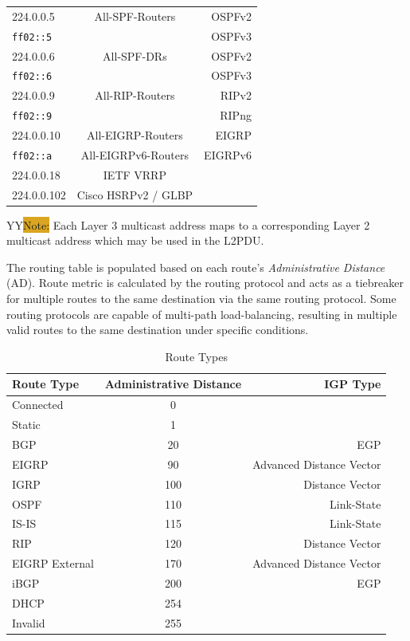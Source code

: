 \documentclass[12pt]{article}
\newcommand{\printColor}{Y}								%
\newcommand{\note}[1]{\if\printColor Y{\colorbox{#1}{Note:}}\else{\underline{Note:}}\fi}
\begin{document}
\begin{table}[H]
\begin{minipage}{.6\linewidth}
\begin{tabular}{| l | c | r|}
	224.0.0.5		& All-SPF-Routers	& OSPFv2\\
	\texttt{ff02::5}	&				& OSPFv3\\\hline
	224.0.0.6		& All-SPF-DRs		& OSPFv2\\
	\texttt{ff02::6}	&				& OSPFv3\\\hline
	224.0.0.9		& All-RIP-Routers		& RIPv2\\
	\texttt{ff02::9}	&				& RIPng\\\hline
	224.0.0.10		& All-EIGRP-Routers	& EIGRP\\
	\texttt{ff02::a}	& All-EIGRPv6-Routers	& EIGRPv6\\\hline
	224.0.0.18		& IETF VRRP		&\\\hline
	224.0.0.102		& Cisco HSRPv2 / GLBP	&\\\hline
	\end{tabular}\end{minipage}\end{table}
	\note{Goldenrod} Each Layer 3 multicast address maps to a corresponding Layer 2 multicast address which may be used in the L2PDU.

	The routing table is populated based on each route's \textit{Administrative Distance} (AD). Route metric is calculated by the routing protocol and acts as a tiebreaker for multiple routes to the same destination via the same routing protocol. Some routing protocols are capable of multi-path load-balancing, resulting in multiple valid routes to the same destination under specific conditions.

	\begin{table}[H]
	\centering
	\caption{Route Types \label{tab:ROUTE TYPES}}
	\begin{tabular}{lcr}\hline
	\textbf{Route Type}	& \textbf{Administrative Distance}	& \textbf{IGP Type}\\\hline
	Connected			& 0						&\\\hline
	Static				& 1						&\\\hline
	BGP				& 20						& EGP\\\hline
	EIGRP				& 90						& Advanced Distance Vector\\\hline
	IGRP				& 100						& Distance Vector\\\hline
	OSPF				& 110						& Link-State\\\hline
	IS-IS				& 115						& Link-State\\\hline
	RIP				& 120						& Distance Vector\\\hline
	EIGRP External		& 170						& Advanced Distance Vector\\\hline
	iBGP				& 200						& EGP\\\hline
	DHCP			& 254						&\\\hline
	Invalid			& 255						&\\\hline
	\end{tabular}\end{table}
\end{document}
